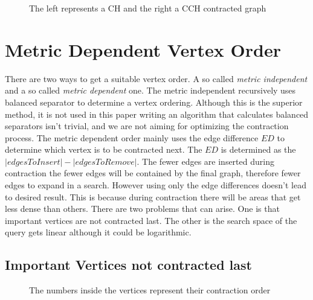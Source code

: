 \begin{figure}
    \centering
    
    \caption{The left represents a CH and the right a CCH contracted graph}
    \label{fig:DifferenceCHAndCCH}
\end{figure}

\section{Metric Dependent Vertex Order}\label{sec:metric_dependent_vertex_order}
There are two ways to get a suitable vertex order. A so called \textit{metric independent} and a so called \textit{metric dependent} one. The metric independent recursively uses balanced separator to determine a vertex ordering\cite{CCH}. Although this is the superior method, it is not used in this paper writing an algorithm that calculates balanced separators isn't trivial, and we are not aiming for optimizing the contraction process. 
The metric dependent order mainly uses the edge difference $ED$ to determine which vertex is to be contracted next. The $ED$ is determined as the $|edges To Insert| - |edges To Remove|$. The fewer edges are inserted during contraction the fewer edges will be contained by the final graph, therefore fewer edges to expand in a search. However using only the edge differences doesn't lead to desired result. This is because during contraction there will be areas that get less dense than others. 
There are two problems that can arise. One is that important vertices are not contracted last. The other is the search space of the query gets linear although it could be logarithmic.

\subsection{Important Vertices not contracted last}\label{sec:not_contracted_last}

\begin{figure}
    \centering
    
    \caption{The numbers inside the vertices represent their contraction order}
    \label{fig:not_contracted_last}
\end{figure}

